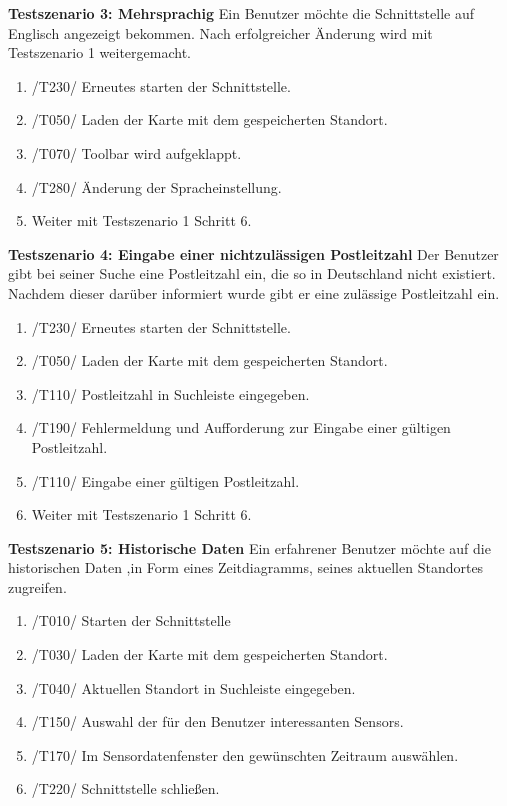 \textbf{Testszenario 3: Mehrsprachig}
\newline
Ein Benutzer möchte die Schnittstelle auf Englisch angezeigt bekommen. Nach erfolgreicher Änderung wird mit Testszenario 1 weitergemacht.
\begin{enumerate} [noitemsep]
    \item /T230/ Erneutes starten der Schnittstelle.
    \item /T050/ Laden der Karte mit dem gespeicherten Standort.
    \item /T070/ \gls{Toolbar} wird aufgeklappt.
    \item /T280/ Änderung der Spracheinstellung.
    \item Weiter mit Testszenario 1 Schritt 6.
\end{enumerate}

\textbf{Testszenario 4: Eingabe einer nichtzulässigen Postleitzahl}
\newline
Der Benutzer gibt bei seiner Suche eine Postleitzahl ein, die so in Deutschland nicht existiert. Nachdem dieser darüber informiert wurde gibt er eine zulässige Postleitzahl ein.
\begin{enumerate} [noitemsep]
    \item /T230/ Erneutes starten der Schnittstelle.
    \item /T050/ Laden der Karte mit dem gespeicherten Standort.
    \item /T110/ Postleitzahl in Suchleiste eingegeben.
    \item /T190/ Fehlermeldung und Aufforderung zur Eingabe einer gültigen Postleitzahl.
    \item /T110/ Eingabe einer gültigen Postleitzahl.
    \item Weiter mit Testszenario 1 Schritt 6.
\end{enumerate}

\textbf{Testszenario 5: Historische Daten}
\newline
Ein erfahrener Benutzer möchte auf die historischen Daten ,in Form eines Zeitdiagramms, seines aktuellen Standortes zugreifen.
\begin{enumerate} [noitemsep]
    \item /T010/ Starten der Schnittstelle
    \item /T030/ Laden der Karte mit dem gespeicherten Standort.
    \item /T040/ Aktuellen Standort in Suchleiste eingegeben.
    \item /T150/ Auswahl der für den Benutzer interessanten \glspl{Sensor}.
    \item /T170/ Im Sensordatenfenster den gewünschten Zeitraum auswählen.
    \item /T220/ Schnittstelle schließen.
\end{enumerate}

